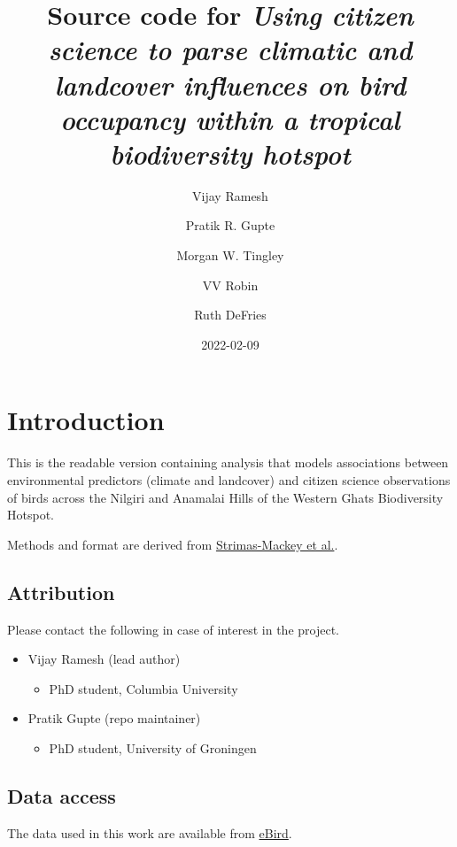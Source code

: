 \documentclass[
]{article}
\title{Source code for \emph{Using citizen science to parse climatic and landcover influences on bird occupancy within a tropical biodiversity hotspot}}
\author{Vijay Ramesh \and Pratik R. Gupte \and Morgan W. Tingley \and VV Robin \and Ruth DeFries}
\date{2022-02-09}
\providecommand{\tightlist}{%
  \setlength{\itemsep}{0pt}\setlength{\parskip}{0pt}}
\begin{document}
\maketitle

{
\setcounter{tocdepth}{2}
\tableofcontents
}
\hypertarget{introduction}{%
\section{Introduction}\label{introduction}}

This is the readable version containing analysis that models associations between environmental predictors (climate and landcover) and citizen science observations of birds across the Nilgiri and Anamalai Hills of the Western Ghats Biodiversity Hotspot.

Methods and format are derived from \href{https://cornelllabofornithology.github.io/ebird-best-practices/}{Strimas-Mackey et al.}.

\hypertarget{attribution}{%
\subsection{Attribution}\label{attribution}}

Please contact the following in case of interest in the project.

\begin{itemize}
\tightlist
\item
  Vijay Ramesh (lead author)

  \begin{itemize}
  \tightlist
  \item
    PhD student, Columbia University
  \end{itemize}
\item
  Pratik Gupte (repo maintainer)

  \begin{itemize}
  \tightlist
  \item
    PhD student, University of Groningen
  \end{itemize}
\end{itemize}

\hypertarget{data-access}{%
\subsection{Data access}\label{data-access}}

The data used in this work are available from \href{http://ebird.org/data/download}{eBird}.
\end{document}
